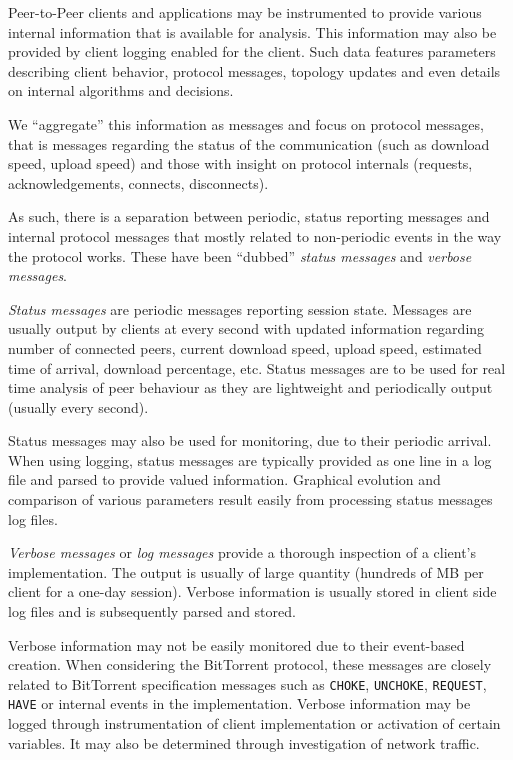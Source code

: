 Peer-to-Peer clients and applications may be instrumented to provide various
internal information that is available for analysis. This information may also
be provided by client logging enabled for the client. Such data features
parameters describing client behavior, protocol messages, topology updates and
even details on internal algorithms and decisions.

We ``aggregate'' this information as messages and focus on protocol messages,
that is messages regarding the status of the communication (such as download
speed, upload speed) and those with insight on protocol internals
(requests, acknowledgements, connects, disconnects).

As such, there is a separation between periodic, status reporting messages and
internal protocol messages that mostly related to non-periodic events in the
way the protocol works. These have been ``dubbed'' \textit{status messages}
and \textit{verbose messages}.

\textit{Status messages} are periodic messages reporting session state.
Messages are usually output by clients at every second with updated
information regarding number of connected peers, current download speed,
upload speed, estimated time of arrival, download percentage, etc. Status
messages are to be used for real time analysis of peer behaviour as they are
lightweight and periodically output (usually every second).

Status messages may also be used for monitoring, due to their periodic
arrival. When using logging, status messages are typically provided as one
line in a log file and parsed to provide valued information. Graphical
evolution and comparison of various parameters result easily from processing
status messages log files.

\textit{Verbose messages} or \textit{log messages} provide a thorough
inspection of a client's implementation. The output is usually of large
quantity (hundreds of MB per client for a one-day session). Verbose
information is usually stored in client side log files and is subsequently
parsed and stored.

Verbose information may not be easily monitored due to their event-based
creation. When considering the BitTorrent protocol, these messages are
closely related to BitTorrent specification messages such as \texttt{CHOKE},
\texttt{UNCHOKE}, \texttt{REQUEST}, \texttt{HAVE} or internal events in the
implementation. Verbose information may be logged through instrumentation of
client implementation or activation of certain variables. It may also be
determined through investigation of network traffic.

